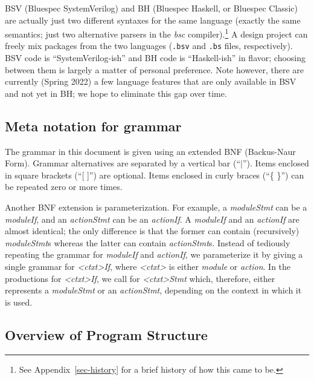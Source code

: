 \documentclass[twoside,letterpaper]{article}
\newcommand{\BH}{BH}
\newcommand{\BSV}{BSV}
\newcommand{\bsc}{\emph{bsc}}
\newcommand{\nterm}[1]{\emph{#1}}
\newcommand{\many}[1]{\{ #1 \}}
\newcommand{\opt}[1]{[ #1 ]}
\newcommand{\alt}{{$\mid$}}
\begin{document}
{\BSV} (Bluespec SystemVerilog) and {\BH} (Bluespec Haskell, or
Bluespec Classic) are actually just two different syntaxes for the
same language (exactly the same semantics; just two alternative
parsers in the {\bsc} compiler).\footnote{ See
  Appendix~\ref{sec-history} for a brief history of how this came to
  be.}  A design project can freely mix packages from the two
languages (\texttt{.bsv} and \texttt{.bs} files, respectively).
{\BSV} code is ``SystemVerilog-ish'' and {\BH} code is ``Haskell-ish''
in flavor; choosing between them is largely a matter of personal
preference.  Note however, there are currently (Spring 2022) a few
language features that are only available in {\BSV} and not yet in
{\BH}; we hope to eliminate this gap over time.


\subsection{Meta notation for grammar}


The grammar in this document is given using an extended BNF
(Backus-Naur Form).  Grammar alternatives are separated by a vertical
bar (``{\alt}'').  Items enclosed in square brackets ({``\opt{}''})
are optional.  Items enclosed in curly braces (``{\many{}}'') can be
repeated zero or more times.

Another BNF extension is parameterization.  For example, a
\nterm{moduleStmt} can be a \nterm{moduleIf}, and an
\nterm{actionStmt} can be an \nterm{actionIf}.  A \nterm{moduleIf} and
an \nterm{actionIf} are almost identical; the only difference is that
the former can contain (recursively) \nterm{moduleStmt}s whereas the
latter can contain \nterm{actionStmt}s.  Instead of tediously
repeating the grammar for \nterm{moduleIf} and \nterm{actionIf}, we
parameterize it by giving a single grammar for \nterm{<ctxt>If}, where
\nterm{<ctxt>} is either \nterm{module} or \nterm{action}.  In the
productions for \nterm{<ctxt>If}, we call for \nterm{<ctxt>Stmt}
which, therefore, either represents a \nterm{moduleStmt} or an
\nterm{actionStmt}, depending on the context in which it is used.


\subsection{Overview of Program Structure}
\end{document}
